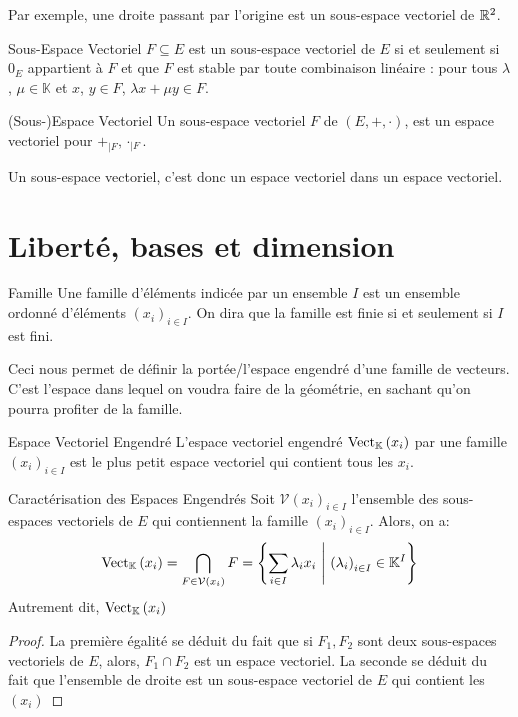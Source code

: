 \documentclass{classe}
\renewcommand*{\K}{\mathbb{K}}
\begin{document}
\begin{example}{}
	Par exemple, une droite passant par l'origine est un sous-espace vectoriel de $\mathbb{R}^2$.
\end{example}

\begin{définition}{Sous-Espace Vectoriel}{}
	$F \subseteq E$ est un sous-espace vectoriel de $E$ si et seulement si $0_E$ appartient à $F$ et que $F$ est stable par toute combinaison linéaire : pour tous $\lambda$, $\mu \in \K$ et $x$, $y\in F$, $\lambda x + \mu y \in F$.
\end{définition}

\begin{propositionfr}{(Sous-)Espace Vectoriel}{}
	Un sous-espace vectoriel $F$ de $\left( E, +, \cdot \right)$, est un espace vectoriel pour $+_{\mid F}, \cdot_{\mid F}$.
\end{propositionfr}

Un sous-espace vectoriel, c'est donc un espace vectoriel dans un espace vectoriel.

\section{Liberté, bases et dimension}

\begin{définition}{Famille}{}
	Une famille d'éléments indicée par un ensemble $I$ est un ensemble ordonné d'éléments $\left( x_{i} \right)_{i \in I}$.
	On dira que la famille est finie si et seulement si $I$ est fini.
\end{définition}

Ceci nous permet de définir la portée/l'espace engendré d'une famille de vecteurs. C'est l'espace dans lequel on voudra faire de la géométrie, en sachant qu'on pourra profiter de la famille.

\begin{définition}{Espace Vectoriel Engendré}{}
	L'espace vectoriel engendré $\Vect_{\K}\left( x_{i} \right)$ par une famille $\left( x_{i}\right)_{i\in I}$ est le plus petit espace vectoriel qui contient tous les $x_{i}$.
\end{définition}

\begin{propositionfr}{Caractérisation des Espaces Engendrés}{}
	Soit $\mathcal{V}\left( x_{i} \right)_{i\in I}$ l'ensemble des sous-espaces vectoriels de $E$ qui contiennent la famille $\left(x_{i}\right)_{i\in I}$.
	Alors, on a:
	\begin{equation*}
		\Vect_{\K}\left( x_{i} \right) = \bigcap_{F \in \mathcal{V}\left( x_{i} \right)} F = \left\{ \sum_{i\in I}\lambda_{i}x_{i}\ \middle| \ \left(\lambda_{i}\right)_{i\in I} \in \K^{I}\right\}
	\end{equation*}
	Autrement dit, $\Vect_{\K}\left( x_{i} \right)$
\end{propositionfr}
\begin{proof}
	La première égalité se déduit du fait que si $F_{1}, F_{2}$ sont deux sous-espaces vectoriels de $E$, alors, $F_{1} \cap F_{2}$ est un espace vectoriel.
	La seconde se déduit du fait que l'ensemble de droite est un sous-espace vectoriel de $E$ qui contient les $\left( x_{i} \right)$
\end{proof}
\end{document}
